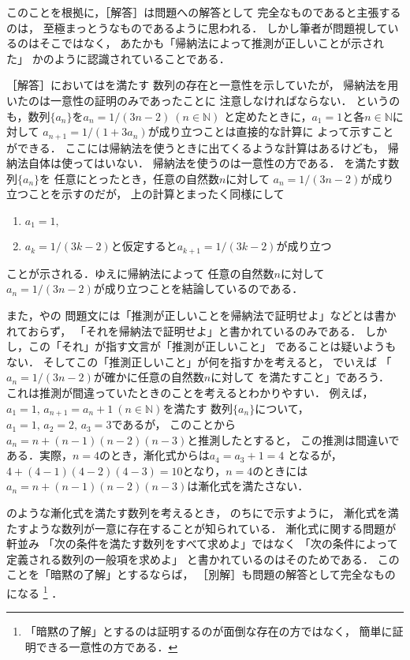 \documentclass[11pt,a4paper]{ltjsarticle} %
\theoremstyle{mystyle} %
\begin{document}
このことを根拠に，［解答］は問題への解答として
完全なものであると主張するのは，
至極まっとうなものであるように思われる．
しかし筆者が問題視しているのはそこではなく，
あたかも「帰納法によって推測が正しいことが示された」
かのように認識されていることである．

［解答］においてはを満たす
数列の存在と一意性を示していたが，
帰納法を用いたのは一意性の証明のみであったことに
注意しなければならない．
というのも，数列$\{ a_n \}$を$a_n = 1/(3n-2) \ (n \in \mathbb{N})$
と定めたときに，$a_1 = 1$と各$n \in \mathbb{N}$に対して
$a_{n+1} = 1 / (1+ 3 a_n)$が成り立つことは直接的な計算に
よって示すことができる．
ここには帰納法を使うときに出てくるような計算はあるけども，
帰納法自体は使ってはいない．
帰納法を使うのは一意性の方である．
を満たす数列$\{ a_n \}$を
任意にとったとき，任意の自然数$n$に対して
$a_n = 1/(3n-2)$が成り立つことを示すのだが，
上の計算とまったく同様にして
\begin{enumerate}
	\item $a_1 = 1 ,$
	\item $a_k = 1/(3k-2)$と仮定すると$a_{k+1} = 1/(3k-2)$が成り立つ
\end{enumerate}
ことが示される．ゆえに帰納法によって
任意の自然数$n$に対して$a_n = 1/(3n-2)$が成り立つことを結論しているのである．

また，やの
問題文には「推測が正しいことを帰納法で証明せよ」などとは書かれておらず，
「それを帰納法で証明せよ」と書かれているのみである．
しかし，この「それ」が指す文言が「推測が正しいこと」
であることは疑いようもない．
そしてこの「推測正しいこと」が何を指すかを考えると，
でいえば
「$a_n = 1/(3n-2)$が確かに任意の自然数$n$に対して
を満たすこと」であろう．
これは推測が間違っていたときのことを考えるとわかりやすい．
例えば，$a_1=1, \, a_{n+1} = a_n + 1 \ (n \in \mathbb{N})$を満たす
数列$\{ a_n \}$について，$a_1=1, \, a_2 = 2, \, a_3 = 3 $であるが，
このことから$a_n = n + (n-1)(n-2)(n-3)$と推測したとすると，
この推測は間違いである．実際，$n=4$のとき，漸化式からは$a_4 = a_3 + 1 = 4$
となるが，$4 + (4-1)(4-2)(4-3) = 10$となり，$n=4$のときには
$a_n = n + (n-1)(n-2)(n-3)$は漸化式を満たさない．


のような漸化式を満たす数列を考えるとき，
のちにで示すように，
漸化式を満たすような数列が一意に存在することが知られている．
漸化式に関する問題が軒並み
「次の条件を満たす数列をすべて求めよ」ではなく
「次の条件によって定義される数列の一般項を求めよ」
と書かれているのはそのためである．
このことを「暗黙の了解」とするならば，
［別解］も問題の解答として完全なものになる
\footnote{
	「暗黙の了解」とするのは証明するのが面倒な存在の方ではなく，
	簡単に証明できる一意性の方である．
}
．
\end{document}
